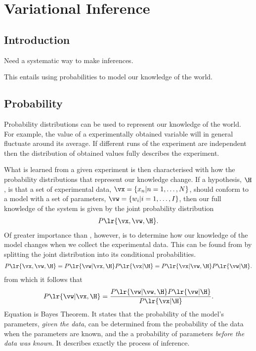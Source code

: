 
\chapter{Variational Inference}{\label{sec:variationalMethods}

\section{Introduction}

Need a systematic way to make inferences.

This entails using probabilities to model our knowledge of the world.



\section{Probability}

Probability distributions can be used to represent our knowledge of the world.
For example, the value of a  experimentally obtained variable will in general
fluctuate around its average.  
If different runs of the experiment are independent
then the  distribution of obtained values fully describes the experiment.

What is learned from a given experiment is then characterised with how the probability distributions
that represent our knowledge change.
If a hypothesis, $\H$, is that a set of experimental data, $\vx = \{x_n|n=1,\ldots,N\}$, should conform to a model with a set of parameters, $\vw = \{w_i| i=1,\ldots,I\}$,
then our full knowledge of the system is given by the joint probability distribution
\begin{align}
  P\lr{\vx,\vw,\H}.
  \label{eqn:fullJointDist}
\end{align}
Of greater importance than , however,
is to determine how our knowledge of the model changes when we collect the experimental data.
This can be found from   by splitting the joint distribution into its conditional probabilities.
\begin{align}
  P\lr{\vx,\vw,\H} = P\lr{\vw|\vx,\H}P\lr{\vx|\H}
  =  P\lr{\vx|\vw,\H} P\lr{\vw|\H}.
\end{align}
from which it follows that 
\begin{align}
   P\lr{\vw|\vx,\H} =  \frac{P\lr{\vw|\vw,\H} P\lr{\vw|\H}}{P\lr{\vx|\H}}.
  \label{eqn:BayesTheorem}
\end{align}
Equation  is Bayes Theorem.
It states that the probability of the model's parameters, {\em given the data},
can be determined from the probability of the data when the parameters are known, and the a  probability of parameters {\em before the data was known}.
It describes exactly the process of inference.

}
